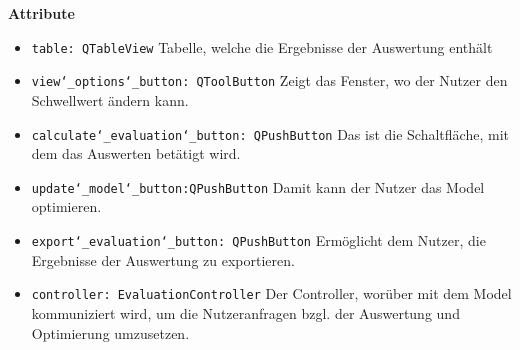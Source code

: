 \documentclass{article}
\begin{document}
\textbf{{Attribute}}
\begin{itemize}
\item \texttt{table: QTableView} \newline Tabelle, welche die Ergebnisse der Auswertung enthält
\item \texttt{view\char`_options\char`_button: QToolButton} \newline Zeigt das Fenster, wo der Nutzer den Schwellwert ändern kann.
\item \texttt{calculate\char`_evaluation\char`_button:  QPushButton} \newline Das ist die Schaltfläche, mit dem das Auswerten betätigt wird.
\item \texttt{update\char`_model\char`_button:QPushButton} \newline  Damit kann der Nutzer das Model optimieren.
\item \texttt{export\char`_evaluation\char`_button:  QPushButton} \newline Ermöglicht dem Nutzer, die Ergebnisse der Auswertung zu exportieren.
\item \texttt{controller: EvaluationController} \newline Der Controller, worüber mit dem Model kommuniziert wird, um die Nutzeranfragen bzgl. der Auswertung und Optimierung umzusetzen.
\end{itemize}
\end{document}
